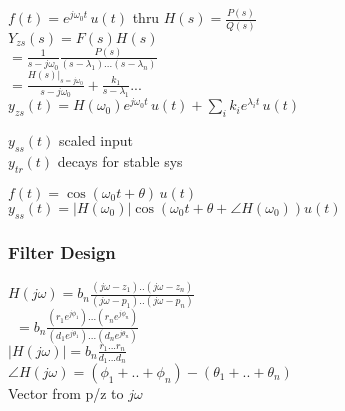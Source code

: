 \documentclass[4pt]{article}
\theoremstyle{definition}
\theoremstyle{definition}
\renewcommand{\o}{\omega}
\begin{document}
\begin{multicols}{3}
    \(f(t) = e^{j\o_0 t}\, u(t)\) thru \(H(s) = \frac{P(s)}{Q(s)}\)\\   %
    \(Y_{zs}(s) = F(s) H(s)\)\\      %
    \(= \frac 1 {s - j\o_0} \frac{P(s)}{(s-\lambda_1)...(s-\lambda_n)}\)\\
    \(= \frac{H(s)|_{s=j\o_0}}{s-j\o_0} + \frac{k_1}{s-\lambda_1} ...\)\\
    \(y_{zs}(t) = H(\o_0)  e^{j\o_0 t} \, u(t) + \sum_i k_i e^{\lambda_i t} \, u(t)\)

    $y_{ss}(t)$ scaled input\\
    $y_{tr}(t)$ decays for stable sys

    \(f(t) = \cos(\o_0 t + \theta) \, u(t)\)\\
    \(y_{ss}(t) = |H(\o_0)| \cos(\o_0 t + \theta + \angle H(\o_0)) u(t)\)

\subsubsection{Filter Design}
    \(H(j\o) = b_n \frac{(j\o-z_1)..(j\o-z_n)}{(j\o-p_1)..(j\o-p_n)}\)\\\
    \(= b_n \frac{(r_1 e^{j\phi_1})...(r_n e^{j\phi_n})}{(d_1 e^{j\theta_1})... (d_n e^{j\theta_n})}\)\\
    \(|H(j\o)| = b_n \frac{r_1 ... r_n}{d_1 ... d_n}\)\\
    \(\angle H(j\o) = (\phi_1 + .. + \phi_n) - (\theta_1 + .. + \theta_n)\)\\

    Vector from p/z to $j\o$
\end{multicols}
\end{document}
